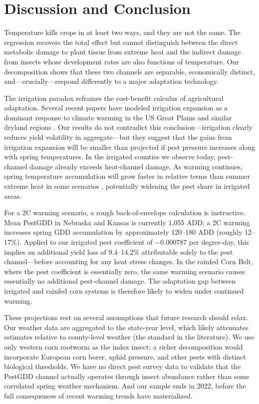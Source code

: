 \documentclass[12pt]{article}
\begin{document}
\section{Discussion and Conclusion}

Temperature kills crops in at least two ways, and they are not the same. The \citet{schlenker2009nonlinear} regression recovers the total effect but cannot distinguish between the direct metabolic damage to plant tissue from extreme heat and the indirect damage from insects whose development rates are also functions of temperature. Our decomposition shows that these two channels are separable, economically distinct, and---crucially---respond differently to a major adaptation technology.

The irrigation paradox reframes the cost-benefit calculus of agricultural adaptation. Several recent papers have modeled irrigation expansion as a dominant response to climate warming in the US Great Plains and similar dryland regions \citep{lobell2014greater, schlenker2005will, massetti2011irrigation}. Our results do not contradict this conclusion---irrigation clearly reduces yield volatility in aggregate---but they suggest that the gains from irrigation expansion will be smaller than projected if pest pressure increases along with spring temperatures. In the irrigated counties we observe today, pest-channel damage already exceeds heat-channel damage. As warming continues, spring temperature accumulation will grow faster in relative terms than summer extreme heat in some scenarios \citep{deutsch2018climate}, potentially widening the pest share in irrigated areas.

For a 2\textdegree{}C warming scenario, a rough back-of-envelope calculation is instructive. Mean PestGDD in Nebraska and Kansas is currently 1,055 ADD; a 2\textdegree{}C warming increases spring GDD accumulation by approximately 120--180 ADD (roughly 12--17\%). Applied to our irrigated pest coefficient of $-0.000787$ per degree-day, this implies an additional yield loss of 9.4--14.2\% attributable solely to the pest channel---before accounting for any heat stress changes. In the rainfed Corn Belt, where the pest coefficient is essentially zero, the same warming scenario causes essentially no additional pest-channel damage. The adaptation gap between irrigated and rainfed corn systems is therefore likely to widen under continued warming.

These projections rest on several assumptions that future research should relax. Our weather data are aggregated to the state-year level, which likely attenuates estimates relative to county-level weather (the standard in the literature). We use only western corn rootworm as the index insect; a richer decomposition would incorporate European corn borer, aphid pressure, and other pests with distinct biological thresholds. We have no direct pest survey data to validate that the PestGDD channel actually operates through insect abundance rather than some correlated spring weather mechanism. And our sample ends in 2022, before the full consequences of recent warming trends have materialized.
\end{document}
